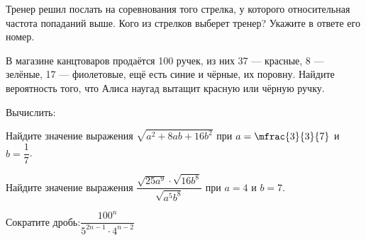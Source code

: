 \begin{class}[number=4]
\begin{listofex}
		Тренер решил послать на соревнования того стрелка, у которого относительная частота попаданий выше. Кого из стрелков выберет тренер? Укажите в ответе его номер.
		\item В магазине канцтоваров продаётся 100 ручек, из них 37 --- красные, 8 --- зелёные, 17 --- фиолетовые, ещё есть синие и чёрные, их поровну. Найдите вероятность того, что Алиса наугад вытащит красную или чёрную ручку.
		\item Вычислить:
		\begin{enumcols}[itemcolumns=3]
			\item {}
			\item {}
			\item {}
		\end{enumcols}
		\item Найдите значение выражения \( \sqrt{a^2+8ab+16b^2} \) при \( a=\mfrac{3}{3}{7} \) и \( b=\dfrac{1}{7} \).
		\item Найдите значение выражения \( \dfrac{\sqrt{25a^9}\cdot\sqrt{16b^8}}{\sqrt{a^5b^8}} \) при \( a=4 \) и \( b=7 \).
		\item Сократите дробь:\quad\( \dfrac{100^n}{5^{2n-1}\cdot4^{n-2}} \)
		\item {}
	\end{listofex}
\end{class}
%
%
